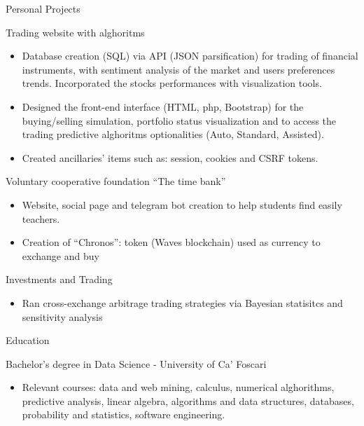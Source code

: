 \documentclass{article}
\newlength{\tabin}
\newlength{\secsep}
\newcommand{\lineunder}{\vspace*{-8pt} \\ \hspace*{-6pt} \hrulefill \\ \vspace*{-15pt}}
\newenvironment{tabbedsection}[1]{
  \begin{list}{}{
      \setlength{\itemsep}{0pt}
      \setlength{\labelsep}{0pt}
      \setlength{\labelwidth}{0pt}
      \setlength{\leftmargin}{\tabin}
      \setlength{\rightmargin}{\tabin}
      \setlength{\listparindent}{0pt}
      \setlength{\parsep}{0pt}
      \setlength{\parskip}{0pt}
      \setlength{\partopsep}{0pt}
      \setlength{\topsep}{#1}
    }
  \item[]
}{\end{list}}
\newenvironment{resume_section}[1]{
  \filbreak
  \vspace{2\secsep}
  \textsc{\large#1}
  \lineunder
  \begin{tabbedsection}{\secsep}
}{\end{tabbedsection}}
\newenvironment{resume_subsection}[2][]{
  \textbf{#2} \hfill {\footnotesize #1} \hspace{2em}
  \begin{tabbedsection}{0.5\secsep}
}{\end{tabbedsection}}
\newenvironment{subitems}{
  \renewcommand{\labelitemi}{-}
  \begin{itemize}
      \setlength{\labelsep}{1em}
}{\end{itemize}}
\begin{document}
\begin{resume_section}{Personal Projects}
  \begin{resume_subsection}[]{Trading website with alghoritms}
  \begin{subitems}
    \item Database creation (SQL) via API (JSON parsification) for trading of financial instruments, with sentiment analysis of the market and users preferences trends. Incorporated the stocks performances with visualization tools.
    \item Designed the front-end interface (HTML, php, Bootstrap) for the buying/selling simulation, portfolio status visualization and to access the trading predictive alghoritms optionalities (Auto, Standard, Assisted).
    \item Created ancillaries’ items such as: session, cookies and CSRF tokens.
    \end{subitems}
  \end{resume_subsection}


  \begin{resume_subsection}[]{Voluntary cooperative foundation “The time bank”}
  \begin{subitems}
    \item Website, social page and telegram bot creation to help students find easily teachers.
    \item  Creation of “Chronos”: token (Waves blockchain) used as currency to exchange and buy
   
    \end{subitems}
  \end{resume_subsection}


 \begin{resume_subsection}[]{Investments and Trading}
 \begin{subitems}
      \item Ran cross-exchange arbitrage trading strategies via Bayesian statisitcs and sensitivity analysis
    \end{subitems}
  \end{resume_subsection}


\begin{resume_section}{Education}
  \begin{resume_subsection}{Bachelor’s degree in Data Science - University of Ca’ Foscari}
   \begin{subitems}
      \item Relevant courses: data and web mining, calculus, numerical alghorithms, predictive analysis, linear algebra,  algorithms and data structures, databases, probability and statistics, software engineering.
     \end{subitems}
  \end{resume_subsection}
  

\end{resume_section}
\end{resume_section}
\end{document}
